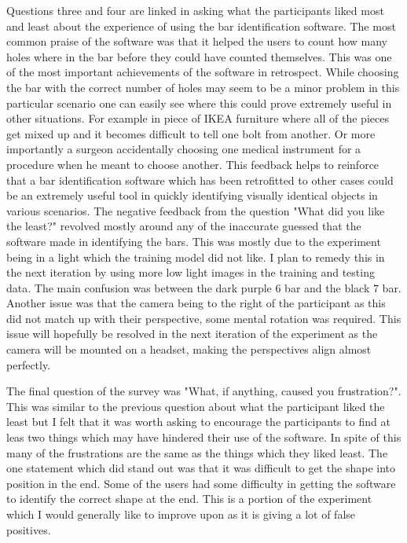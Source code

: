 \documentclass{vgtc}                          %
\begin{document}
Questions three and four are linked in asking what the participants liked most and least about the experience of using the bar identification software. The most common praise of the software was that it helped the users to count how many holes where in the bar before they could have counted themselves. This was one of the most important achievements of the software in retrospect. While choosing the bar with the correct number of holes may seem to be a minor problem in this particular scenario one can easily see where this could prove extremely useful in other situations. For example in piece of IKEA furniture where all of the pieces get mixed up and it becomes difficult to tell one bolt from another. Or more importantly a surgeon accidentally choosing one medical instrument for a procedure when he meant to choose another. This feedback helps to reinforce that a bar identification software which has been retrofitted to other cases could be an extremely useful tool in quickly identifying visually identical objects in various scenarios. The negative feedback from the question "What did you like the least?" revolved mostly around any of the inaccurate guessed that the software made in identifying the bars. This was mostly due to the experiment being in a light which the training model did not like. I plan to remedy this in the next iteration by using more low light images in the training and testing data. The main confusion was between the dark purple 6 bar and the black 7 bar. Another issue was that the camera being to the right of the participant as this did not match up with their perspective, some mental rotation was required. This issue will hopefully be resolved in the next iteration of the experiment as the camera will be mounted on a headset, making the perspectives align almost perfectly.

The final question of the survey was "What, if anything, caused you frustration?". This was similar to the previous question about what the participant liked the least but I felt that it was worth asking to encourage the participants to find at leas two things which may have hindered their use of the software. In spite of this many of the frustrations are the same as the things which they liked least. The one statement which did stand out was that it was difficult to get the shape into position in the end. Some of the users had some difficulty in getting the software to identify the correct shape at the end. This is a portion of the experiment which I would generally like to improve upon as it is giving a lot of false positives.
\end{document}
